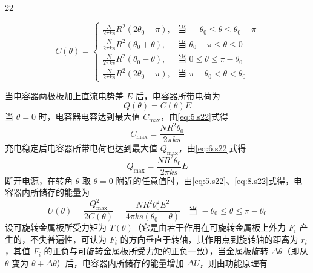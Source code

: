 \begin{solution}{22}
\begin{subsolution}
\begin{equation}
            C(\theta) = \begin{cases}
                \frac{N}{2\pi k s}R^2(2\theta_0 - \pi), & \text{当 } -\theta_0 \leq \theta \leq \theta_0 - \pi \\
                \frac{N}{2\pi k s}R^2(\theta_0 + \theta), & \text{当 } \theta_0 - \pi \leq \theta \leq 0 \\
                \frac{N}{2\pi k s}R^2(\theta_0 - \theta), & \text{当 } 0 \leq \theta \leq \pi - \theta_0 \\
                \frac{N}{2\pi k s}R^2(2\theta_0 - \pi), & \text{当 } \pi - \theta_0 < \theta < \theta_0
            \end{cases}
            \label{eq:5.s22}
        \end{equation}
    \end{subsolution}
    \begin{subsolution}
        当电容器两极板加上直流电势差 $E$ 后，电容器所带电荷为
        \begin{equation}
            Q(\theta) = C(\theta) E
            \label{eq:6.s22}
        \end{equation}
        当 $\theta = 0$ 时，电容器电容达到最大值 $C_{\max}$，由\eqref{eq:5.s22}式得
        \begin{equation}
            C_{\max} = \frac{N R^2 \theta_0}{2\pi k s}
            \label{eq:7.s22}
        \end{equation}
        充电稳定后电容器所带电荷也达到最大值 $Q_{\max}$，由\eqref{eq:6.s22}式得
        \begin{equation}
            Q_{\max} = \frac{N R^2 \theta_0}{2\pi k s} E
            \label{eq:8.s22}
        \end{equation}
        断开电源，在转角 $\theta$ 取 $\theta = 0$ 附近的任意值时，由\eqref{eq:5.s22}、\eqref{eq:8.s22}式得，电容器内所储存的能量为
        \begin{equation}
            U(\theta) = \frac{Q_{\max}^2}{2C(\theta)} = \frac{N R^2 \theta_0^2 E^2}{4\pi k s (\theta_0 - \theta)} \quad \text{当 } -\theta_0 \leq \theta \leq \pi - \theta_0
            \label{eq:9.s22}
        \end{equation}
        设可旋转金属板所受力矩为 $T(\theta)$（它是由若干作用在可旋转金属板上外力 $F_i$ 产生的，不失普遍性，可认为 $F_i$ 的方向垂直于转轴，其作用点到旋转轴的距离为 $r_i$，其值 $F_i$ 的正负与可旋转金属板所受力矩的正负一致），当金属板旋转 $\Delta\theta$（即从 $\theta$ 变为 $\theta + \Delta\theta$）后，电容器内所储存的能量增加 $\Delta U$，则由功能原理有
        \begin{equation}

\end{equation}
\end{subsolution}
\end{solution}
